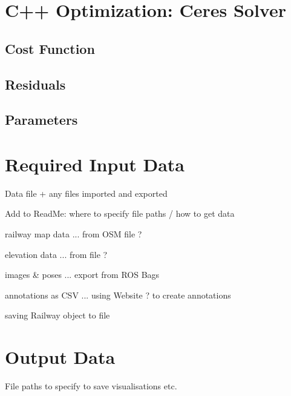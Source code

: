 \section{C++ Optimization: Ceres Solver}

\subsection{Cost Function}

\subsection{Residuals}

\subsection{Parameters}



\section{Required Input Data}

Data file + any files imported and exported

Add to ReadMe: where to specify file paths / how to get data


railway map data ... from OSM file ?

elevation data ... from file ?



images \& poses ... export from ROS Bags



annotations as CSV ... using Website ? to create annotations

saving Railway object to file


\section{Output Data}

File paths to specify to save visualisations etc.